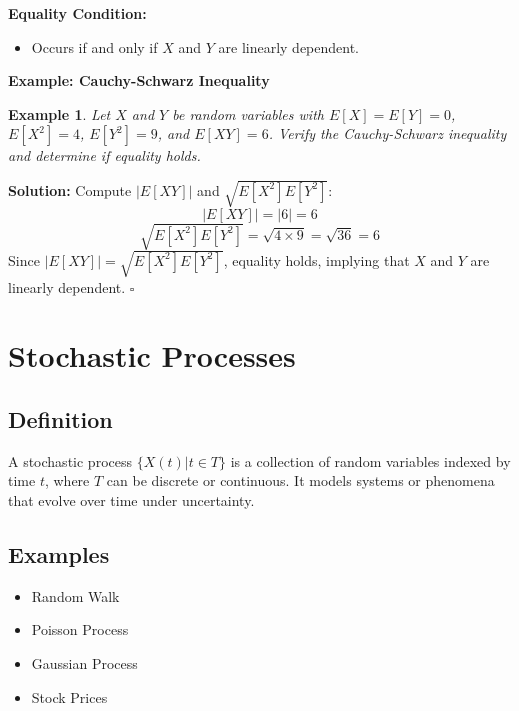 \documentclass[12pt]{article}
\newtheorem{example}{Example}
\newenvironment{solution}{\noindent\textbf{Solution:}}{\hfill$\square$}
\begin{document}
\textbf{Equality Condition:}
\begin{itemize}
    \item Occurs if and only if \( X \) and \( Y \) are linearly dependent.
\end{itemize}

\textbf{Example: Cauchy-Schwarz Inequality}
\begin{example}
Let \( X \) and \( Y \) be random variables with \( E[X] = E[Y] = 0 \), \( E[X^2] = 4 \), \( E[Y^2] = 9 \), and \( E[XY] = 6 \). Verify the Cauchy-Schwarz inequality and determine if equality holds.
\end{example}
\begin{solution}
Compute \( |E[XY]| \) and \( \sqrt{E[X^2] E[Y^2]} \):
\[
|E[XY]| = |6| = 6
\]
\[
\sqrt{E[X^2] E[Y^2]} = \sqrt{4 \times 9} = \sqrt{36} = 6
\]
Since \( |E[XY]| = \sqrt{E[X^2] E[Y^2]} \), equality holds, implying that \( X \) and \( Y \) are linearly dependent.
\end{solution}

\section{Stochastic Processes}
\subsection{Definition}
A stochastic process \( \{X(t) | t \in T\} \) is a collection of random variables indexed by time \( t \), where \( T \) can be discrete or continuous. It models systems or phenomena that evolve over time under uncertainty.

\subsection{Examples}
\begin{itemize}
    \item Random Walk
    \item Poisson Process
    \item Gaussian Process
    \item Stock Prices
\end{itemize}
\end{document}
